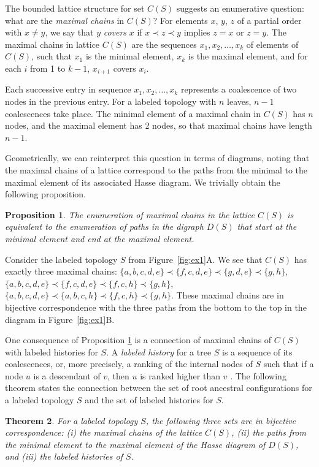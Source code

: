 \documentclass[10pt]{article}
\newtheorem{theorem}{Theorem}
\newtheorem{proposition}[theorem]{Proposition}
\begin{document}
The bounded lattice structure for set $C(S)$ suggests an enumerative question: what are the \emph{maximal chains} in $C(S)$? For elements $x$, $y$, $z$ of a partial order with $x \neq y$, we say that $y$ \emph{covers} $x$ if $x \prec z \prec y$ implies $z = x \text{ or } z = y$. The maximal chains in lattice $C(S)$ are the sequences $x_1, x_2, \ldots, x_k$ of elements of $C(S)$, such that $x_1$ is the minimal element, $x_k$ is the maximal element, and for each $i$ from 1 to $k-1$, $x_{i+1}$ covers $x_i$.

Each successive entry in sequence $x_1, x_2, \ldots, x_k$ represents a coalescence of two nodes in the previous entry. For a labeled topology with $n$ leaves, $n-1$ coalescences take place. The minimal element of a maximal chain in $C(S)$ has $n$ nodes, and the maximal element has 2 nodes, so that maximal chains have length $n-1$.

Geometrically, we can reinterpret this question in terms of diagrams, noting that the maximal chains of a lattice correspond to the paths from the minimal to the maximal element of its associated Hasse diagram. We trivially obtain the following proposition.
\begin{proposition}\label{prop:equivalence}
	The enumeration of maximal chains in the lattice $C(S)$ is equivalent to the enumeration of paths in the digraph $D(S)$ that start at the minimal element and end at the maximal element. 
\end{proposition}
Consider the labeled topology $S$ from Figure~\ref{fig:ex1}A. We see that $C(S)$ has exactly three maximal chains: $\{a,b,c,d,e\} \prec \{f,c,d,e\} \prec \{g,d,e\} \prec \{g,h\}$,  $\{a,b,c,d,e\} \prec \{f,c,d,e\} \prec \{f,c,h\} \prec \{g,h\}$,  $\{a,b,c,d,e\} \prec \{a,b,c,h\} \prec \{f,c,h\} \prec \{g,h\}$. These maximal chains are in bijective correspondence with the three paths from the bottom to the top in the diagram in Figure~\ref{fig:ex1}B.

One consequence of Proposition \ref{prop:equivalence} is a connection of maximal chains of $C(S)$ with labeled histories for $S$. A \emph{labeled history} for a tree $S$ is a sequence of its coalescences, or, more precisely, a ranking of the internal nodes of $S$ such that if a node $u$ is a descendant of $v$, then $u$ is ranked higher than $v$ \citep[p.~45]{steel2016phylogeny}. 
The following theorem states the connection between the set of root ancestral configurations for a labeled topology $S$ and the set of labeled histories for $S$.
\begin{theorem}\label{thm:histories_paths}
	For a labeled topology $S$, the following three sets are in bijective correspondence: (i) the maximal chains of the lattice $C(S)$, (ii) the paths from the minimal element to the maximal element of the Hasse diagram of $D(S)$, and (iii) the labeled histories of $S$.
\end{theorem}
\end{document}
